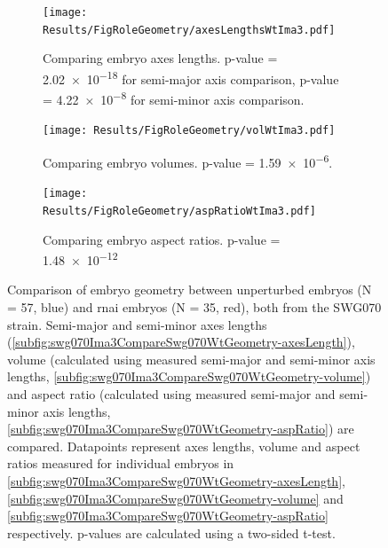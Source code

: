 \begin{figure}
\centering
\begin{subfigure}[t]{0.3\textwidth}
    \centering
    \texttt{[image: Results/FigRoleGeometry/axesLengthsWtIma3.pdf]}
    \caption{Comparing embryo axes lengths. p-value = \num{2.02e-18} for semi-major axis comparison, p-value = \num{4.22e-8} for semi-minor axis comparison.} 
    \label{subfig:swg070Ima3CompareSwg070WtGeometry-axesLength}
\end{subfigure}
\hfill
\begin{subfigure}[t]{0.3\textwidth}
    \centering
    \texttt{[image: Results/FigRoleGeometry/volWtIma3.pdf]}
    \caption{Comparing embryo volumes. p-value = \num{1.59e-6}.} 
    \label{subfig:swg070Ima3CompareSwg070WtGeometry-volume}
\end{subfigure}
\hfill
\begin{subfigure}[t]{0.3\textwidth}
    \centering
    \texttt{[image: Results/FigRoleGeometry/aspRatioWtIma3.pdf]}
    \caption{Comparing embryo aspect ratios. p-value = \num{1.48e-12}} 
    \label{subfig:swg070Ima3CompareSwg070WtGeometry-aspRatio}
\end{subfigure}
\caption[Comparing embryo geometry between unperturbed embryos and  \acs{rnai} embryos]{Comparison of embryo geometry between unperturbed embryos (N = 57, blue) and  \ac{rnai} embryos (N = 35, red), both from the SWG070 strain. Semi-major \longAxisLength and semi-minor \shortAxisLength axes lengths (\autoref{subfig:swg070Ima3CompareSwg070WtGeometry-axesLength}), volume (calculated using measured semi-major and semi-minor axis lengths, \autoref{subfig:swg070Ima3CompareSwg070WtGeometry-volume}) and aspect ratio (calculated using measured semi-major and semi-minor axis lengths, \autoref{subfig:swg070Ima3CompareSwg070WtGeometry-aspRatio}) are compared. Datapoints represent axes lengths, volume and aspect ratios measured for individual embryos in \autoref{subfig:swg070Ima3CompareSwg070WtGeometry-axesLength}, \autoref{subfig:swg070Ima3CompareSwg070WtGeometry-volume} and \autoref{subfig:swg070Ima3CompareSwg070WtGeometry-aspRatio} respectively. p-values are calculated using a two-sided t-test.}
\label{fig:swg070Ima3CompareSwg070WtGeometry}
\end{figure}

